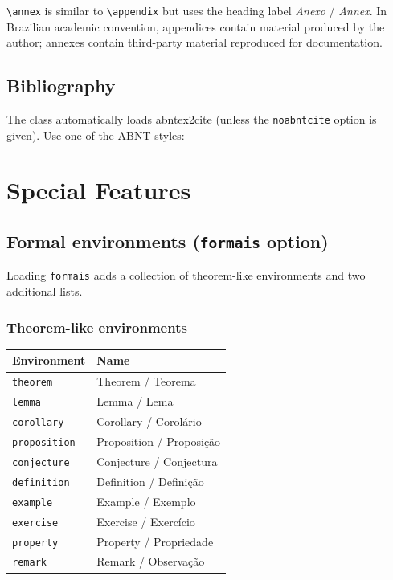 \documentclass[11pt,a4paper]{article}
\newcommand{\pkg}[1]{\textsf{#1}}
\newcommand{\opt}[1]{\texttt{#1}}
\newcommand{\cmd}[1]{\texttt{\textbackslash #1}}
\newcommand{\env}[1]{\texttt{#1}}
\begin{document}
\cmd{annex} is similar to \cmd{appendix} but uses the heading label
\textit{Anexo} / \textit{Annex}.  In Brazilian academic convention,
appendices contain material produced by the author; annexes contain
third-party material reproduced for documentation.

\subsection{Bibliography}

The class automatically loads \pkg{abntex2cite} (unless the
\opt{noabntcite} option is given).  Use one of the ABNT styles:

\begin{latex}

\end{latex}

\section{Special Features}

\subsection{Formal environments (\opt{formais} option)}
\label{sec:formais}

Loading \opt{formais} adds a collection of theorem-like environments
and two additional lists.

\subsubsection{Theorem-like environments}

\begin{center}
\begin{tabular}{@{}ll@{}}
  \toprule
  Environment & Name \\
  \midrule
  \env{theorem}      & Theorem / Teorema \\
  \env{lemma}        & Lemma / Lema \\
  \env{corollary}    & Corollary / Corolário \\
  \env{proposition}  & Proposition / Proposição \\
  \env{conjecture}   & Conjecture / Conjectura \\
  \env{definition}   & Definition / Definição \\
  \env{example}      & Example / Exemplo \\
  \env{exercise}     & Exercise / Exercício \\
  \env{property}     & Property / Propriedade \\
  \env{remark}       & Remark / Observação \\
  \bottomrule
\end{tabular}
\end{center}
\end{document}
